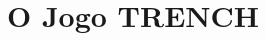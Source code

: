 \documentclass[a4paper]{article}
\begin{document}

\newpage

%
%
%
%
%
%
%


\section{O Jogo TRENCH}
\end{document}
